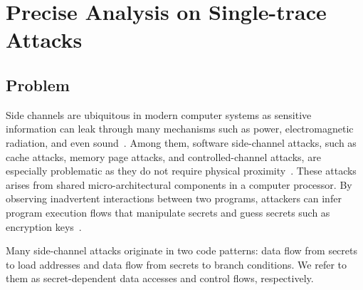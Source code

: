 
\chapter{Precise Analysis on Single-trace Attacks}\label{chapter4}

\section{Problem}
Side channels are ubiquitous in modern computer systems as sensitive
information can leak through many mechanisms such as power,
electromagnetic radiation, and even
sound~\cite{agrawal2002side,kar20178,chari1999towards,217605,genkin2014rsa}.
Among them, software side-channel attacks, such as cache attacks, memory page
attacks, and controlled-channel attacks, are especially problematic as they do not require physical proximity~\cite{7163052,217543,217589,lee2017inferring,191010,liu2015last}. These
attacks arises from shared micro-architectural components in a computer processor.
By observing inadvertent interactions between two programs, attackers can infer program
execution flows that manipulate secrets and guess secrets such as encryption
keys~\cite{Osvik2006,Gullasch:2011:CGB:2006077.2006784,203878,10.1007/978-3-540-45238-6_6}.


Many side-channel attacks originate
in two code patterns: data flow from secrets to load
addresses and data flow from secrets to branch conditions. We refer to them as
secret-dependent data accesses and control flows, respectively. 

